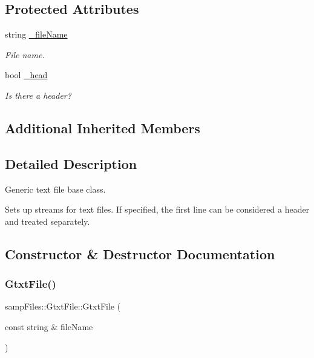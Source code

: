\subsection*{Protected Attributes}
\begin{DoxyCompactItemize}
\item 
\mbox{\label{classsamp_files_1_1_gtxt_file_a6bb0295beed42ba848f8e2fb73d17e2a}} 
string \hyperlink{classsamp_files_1_1_gtxt_file_a6bb0295beed42ba848f8e2fb73d17e2a}{\+\_\+file\+Name}
\begin{DoxyCompactList}\small\item\em File name. \end{DoxyCompactList}\item 
\mbox{\label{classsamp_files_1_1_gtxt_file_a44b688239f4ede24fc31a34583ced570}} 
bool \hyperlink{classsamp_files_1_1_gtxt_file_a44b688239f4ede24fc31a34583ced570}{\+\_\+head}
\begin{DoxyCompactList}\small\item\em Is there a header? \end{DoxyCompactList}\end{DoxyCompactItemize}
\subsection*{Additional Inherited Members}


\subsection{Detailed Description}
Generic text file base class. 

Sets up streams for text files. If specified, the first line can be considered a header and treated separately. 

\subsection{Constructor \& Destructor Documentation}
\mbox{\label{classsamp_files_1_1_gtxt_file_a8fa6b2a9127d2c66de0c4d6b14555e66}} 
\subsubsection{\texorpdfstring{Gtxt\+File()}{GtxtFile()}\hspace{0.1cm}{\footnotesize\ttfamily [1/2]}}
{\footnotesize\ttfamily samp\+Files\+::\+Gtxt\+File\+::\+Gtxt\+File (\begin{DoxyParamCaption}\item[{const string \&}]{file\+Name }\end{DoxyParamCaption})\hspace{0.3cm}{\ttfamily [inline]}}



